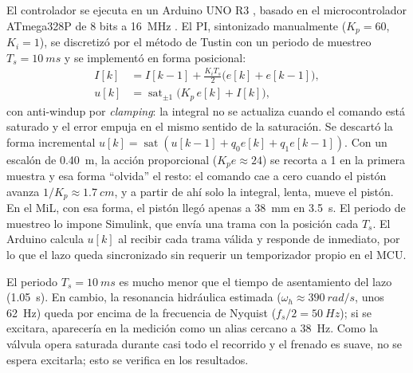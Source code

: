 \documentclass[conference]{IEEEtran}
\begin{document}
El controlador se ejecuta en un Arduino UNO R3 \cite{arduino_uno}, basado en el microcontrolador ATmega328P de 8 bits a \SI{16}{MHz} \cite{atmega328p}. El PI, sintonizado manualmente ($K_p=60$, $K_i=1$), se discretizó por el método de Tustin con un periodo de muestreo $T_s=\SI{10}{ms}$ y se implementó en forma posicional:
\begin{equation}
\begin{aligned}
I[k] &= I[k-1] + \tfrac{K_iT_s}{2}\big(e[k]+e[k-1]\big),\\
u[k] &= \operatorname{sat}_{\pm1}\!\big(K_p\, e[k] + I[k]\big),
\end{aligned}
\label{eq:pi}
\end{equation}
con anti-windup por \textit{clamping}: la integral no se actualiza cuando el comando está saturado y el error empuja en el mismo sentido de la saturación. Se descartó la forma incremental $u[k]=\operatorname{sat}(u[k-1]+q_0e[k]+q_1e[k-1])$. Con un escalón de \SI{0.40}{m}, la acción proporcional ($K_p e\approx24$) se recorta a 1 en la primera muestra y esa forma ``olvida'' el resto: el comando cae a cero cuando el pistón avanza $1/K_p\approx\SI{1.7}{cm}$, y a partir de ahí solo la integral, lenta, mueve el pistón. En el MiL, con esa forma, el pistón llegó apenas a \SI{38}{mm} en \SI{3.5}{s}. El periodo de muestreo lo impone Simulink, que envía una trama con la posición cada $T_s$. El Arduino calcula $u[k]$ al recibir cada trama válida y responde de inmediato, por lo que el lazo queda sincronizado sin requerir un temporizador propio en el MCU.

El periodo $T_s=\SI{10}{ms}$ es mucho menor que el tiempo de asentamiento del lazo (\SI{1.05}{s}). En cambio, la resonancia hidráulica estimada ($\omega_h\approx\SI{390}{rad/s}$, unos \SI{62}{Hz}) queda por encima de la frecuencia de Nyquist ($f_s/2=\SI{50}{Hz}$); si se excitara, aparecería en la medición como un alias cercano a \SI{38}{Hz}. Como la válvula opera saturada durante casi todo el recorrido y el frenado es suave, no se espera excitarla; esto se verifica en los resultados.




\newpage
\end{document}
